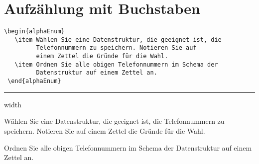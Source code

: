 \documentclass[a4paper]{scrartcl}
\begin{document}
\section*{Aufzählung mit Buchstaben}
 \begin{lstlisting}[gobble=1,caption={}]
 \begin{alphaEnum}
   \item Wählen Sie eine Datenstruktur, die geeignet ist, die
         Telefonnummern zu speichern. Notieren Sie auf
         einem Zettel die Gründe für die Wahl.
   \item Ordnen Sie alle obigen Telefonnummern im Schema der
         Datenstruktur auf einem Zettel an.
 \end{alphaEnum}
 \end{lstlisting}

 \vspace{0.6cm}
 \hrule width \textwidth
 \vspace{1cm}

 \begin{alphaEnum}
   \item Wählen Sie eine Datenstruktur, die geeignet ist, die
         Telefonnummern zu speichern. Notieren Sie auf
         einem Zettel die Gründe für die Wahl.
   \item Ordnen Sie alle obigen Telefonnummern im Schema der
         Datenstruktur auf einem Zettel an.
 \end{alphaEnum}
\end{document}
